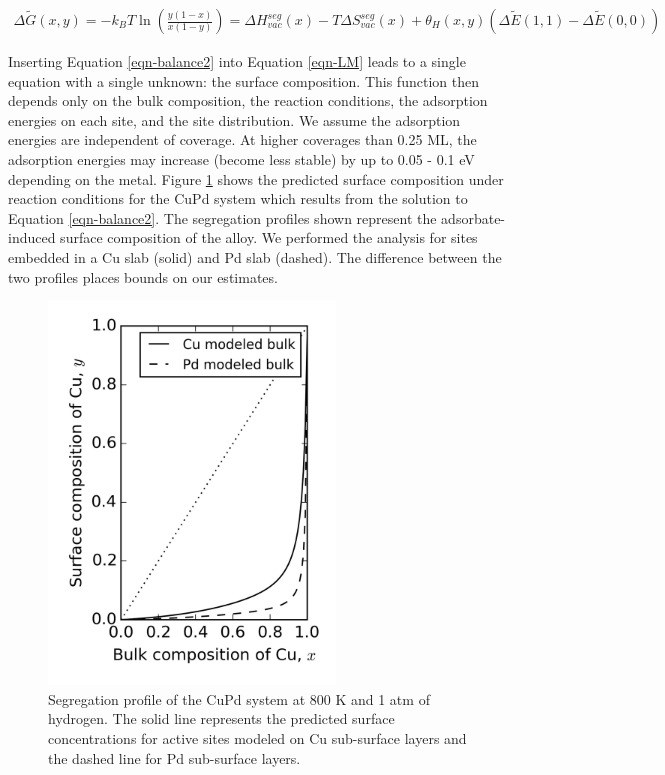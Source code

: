 \documentclass[12pt]{cmuthesis}
\begin{document}
\begin{eqnarray}
\Delta \widetilde{G} (x,y) = -k_{B}T \ln\left(\frac{y(1-x)}{x(1-y)}\right) =  \Delta H^{seg}_{vac} (x) - T \Delta S^{seg}_{vac} (x) + \theta_{H} (x,y) \left(\Delta \widetilde{E}(1,1) - \Delta \widetilde{E}(0,0)\right)
\label{eqn-balance2}
\end{eqnarray}

Inserting Equation \eqref{eqn-balance2} into Equation \eqref{eqn-LM} leads to a single equation with a single unknown: the surface composition. This function then depends only on the bulk composition, the reaction conditions, the adsorption energies on each site, and the site distribution. We assume the adsorption energies are independent of coverage. At higher coverages than 0.25 ML, the adsorption energies may increase (become less stable) by up to 0.05 - 0.1 eV depending on the metal. Figure \ref{fig-seg} shows the predicted surface composition under reaction conditions for the CuPd system which results from the solution to Equation \eqref{eqn-balance2}. The segregation profiles shown represent the adsorbate-induced surface composition of the alloy. We performed the analysis for sites embedded in a Cu slab (solid) and Pd slab (dashed). The difference between the two profiles places bounds on our estimates.

\begin{figure}[h]
\centering
\includegraphics[width=3in]{./images/segtot.png}
\caption{Segregation profile of the CuPd system at 800 K and 1 atm of hydrogen. The solid line represents the predicted surface concentrations for active sites modeled on Cu sub-surface layers and the dashed line for Pd sub-surface layers. \label{fig-seg}}
\end{figure}
\end{document}
